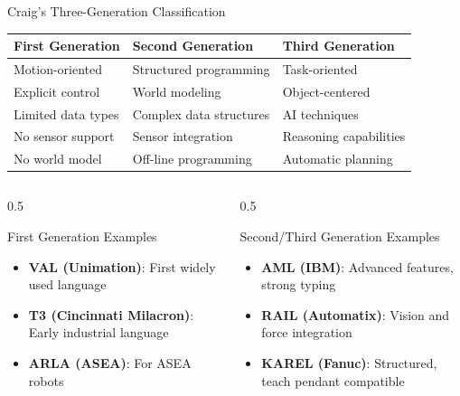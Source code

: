 \documentclass[10pt,aspectratio=169]{beamer}
\begin{document}
\begin{frame}{Craig's Three-Generation Classification}
\begin{table}
\centering
\footnotesize
\begin{tabular}{p{}p{}p{}}
\toprule
\textbf{First Generation} & \textbf{Second Generation} & \textbf{Third Generation} \\
\midrule
Motion-oriented & Structured programming & Task-oriented \\
Explicit control & World modeling & Object-centered \\
Limited data types & Complex data structures & AI techniques \\
No sensor support & Sensor integration & Reasoning capabilities \\
No world model & Off-line programming & Automatic planning \\
\bottomrule
\end{tabular}
\end{table}

\begin{columns}[T]
\begin{column}{0.5\textwidth}
\begin{exampleblock}{First Generation Examples}
\begin{itemize}
\item \textbf{VAL (Unimation)}: First widely used language
\item \textbf{T3 (Cincinnati Milacron)}: Early industrial language
\item \textbf{ARLA (ASEA)}: For ASEA robots
\end{itemize}
\end{exampleblock}
\end{column}
\begin{column}{0.5\textwidth}
\begin{exampleblock}{Second/Third Generation Examples}
\begin{itemize}
\item \textbf{AML (IBM)}: Advanced features, strong typing
\item \textbf{RAIL (Automatix)}: Vision and force integration
\item \textbf{KAREL (Fanuc)}: Structured, teach pendant compatible
\end{itemize}
\end{exampleblock}
\end{column}
\end{columns}
\end{frame}
\end{document}
